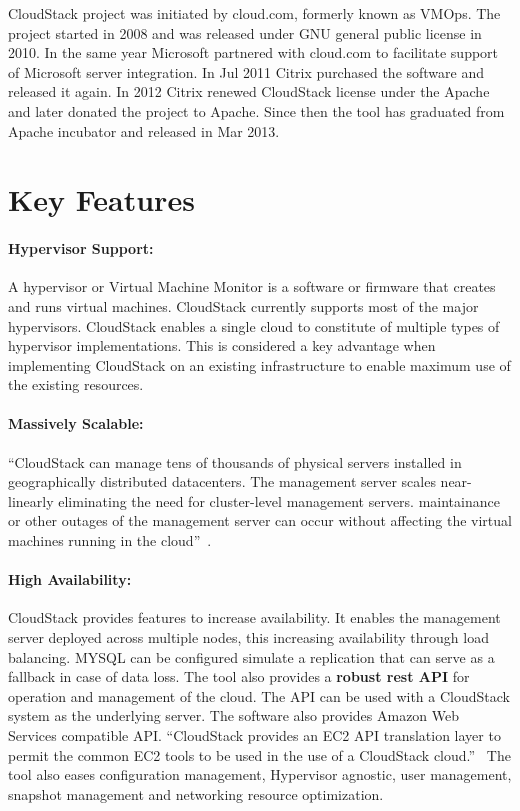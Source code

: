 CloudStack project was initiated by cloud.com, formerly known as
VMOps.  The project started in 2008 and was released under GNU general
public license in 2010.  In the same year Microsoft partnered with cloud.com to 
facilitate support of Microsoft server integration. 
In Jul 2011 Citrix purchased the software and
released it again. In 2012 Citrix renewed CloudStack license under
the Apache and later donated the project to Apache.  Since then the
tool has graduated from Apache incubator and released in Mar 2013.


\section{Key Features}

\paragraph{Hypervisor Support:} A hypervisor or Virtual Machine
Monitor is a software or firmware that creates and runs virtual
machines. CloudStack currently supports most of the major hypervisors.
CloudStack enables a single cloud to constitute of multiple types of
hypervisor implementations. This is considered a key advantage when
implementing CloudStack on an existing infrastructure to enable
maximum use of the existing resources. 

\paragraph{Massively Scalable:}
``CloudStack can manage tens of thousands of physical servers installed
in geographically distributed datacenters. The management server
scales near-linearly eliminating the need for cluster-level management
servers. maintainance or other outages of the management server can
occur without affecting the virtual machines running in the cloud''~\cite{hid-sp18-417-www-cloudstack-scalability}.

\paragraph{High Availability:} CloudStack provides features to
increase availability. It enables the management server deployed
across multiple nodes, this increasing availability through load
balancing. MYSQL can be configured simulate a replication that can
serve as a fallback in case of data loss. The tool also provides a
{\bf robust rest API} for operation and management of the cloud. The
API can be used with a CloudStack system as the underlying server.
The software also provides Amazon Web Services compatible
API. ``CloudStack provides an EC2 API translation layer to permit the
common EC2 tools to be used in the use of a CloudStack
cloud.''~\cite{hid-sp18-417-www-cloudstack-aws} The tool also eases
configuration management, Hypervisor agnostic, user management,
snapshot management and networking resource optimization.

